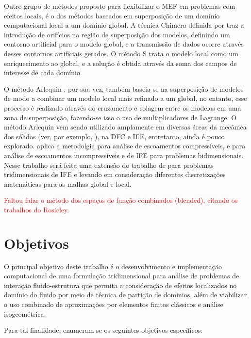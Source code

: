 \documentclass[tese_patricia.tex]{subfiles}
\begin{document}
Outro grupo de métodos proposto para flexibilizar o MEF em problemas com efeitos locais, é o dos métodos baseados em superposição de um domínio computacional local a um domínio global. A técnica Chimera definida por  traz a introdução de orifícios na região de superposição dos modelos, definindo um contorno artificial para o modelo global, e a transmissão de dados ocorre através desses contornos artificiais gerados. O método S \cite{Fish:1992} trata o modelo local como um enriquecimento ao global, e a solução é obtida através da soma dos campos de interesse de cada domínio.

O método Arlequin \cite{Dhia:1998,DhiaR:2001}, por sua vez, também baseia-se na superposição de modelos de modo a combinar um modelo local mais refinado a um global, no entanto, esse processo é realizado através do cruzamento e colagem entre os modelos em uma zona de superposição, fazendo-se isso o uso de multiplicadores de Lagrange.  O método Arlequin vem sendo utilizado amplamente em diversas áreas da mecânica dos sólidos (ver, por exemplo, ), na DFC e IFE, entretanto, ainda é pouco explorado.  aplica a metodolgia para análise de escoamentos compressíveis, e  para análise de escoamentos incompressíveis e de IFE para problemas bidimensionais. Nesse trabalho será feita uma extensão do trabalho de   para problemas tridimensionais de IFE e levando em consideração diferentes discretizações matemáticas para as malhas global e local.

\textcolor{red}{Faltou falar o método dos espaços de função combinados (blended), citando os trabalhos do Rosicley}.


\section[Objetivos]{Objetivos}

O principal objetivo deste trabalho é o desenvolvimento e implementação computacional de uma formulação tridimensional para análise de problemas de interação fluido-estrutura que permita a consideração de efeitos localizados no domínio do fluido por meio de técnica de partição de domínios, além de viabilizar o uso combinado de aproximações por elementos finitos clássicos e análise isogeométrica.

Para tal finalidade, enumeram-se os seguintes objetivos específicos:
\end{document}
